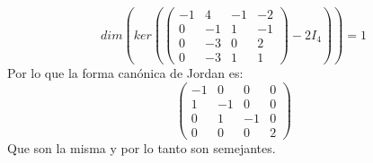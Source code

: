 \documentclass{article}
\begin{document}
$$
dim\left(ker\left(\left(\begin{matrix}
-1 & 4 & -1 & -2 \\
0 & -1 & 1 & -1 \\
0 & -3 & 0 & 2 \\
0 & -3 & 1 & 1
\end{matrix}\right)-2 I_4\right)\right)=1
$$
Por lo que la forma canónica de Jordan es:
$$
\left(\begin{matrix}
-1 & 0 & 0 & 0 \\
1 & -1 & 0 & 0 \\
0 & 1 & -1 & 0 \\
0 & 0 & 0 & 2
\end{matrix}\right)
$$
Que son la misma y por lo tanto son semejantes.
\end{document}
